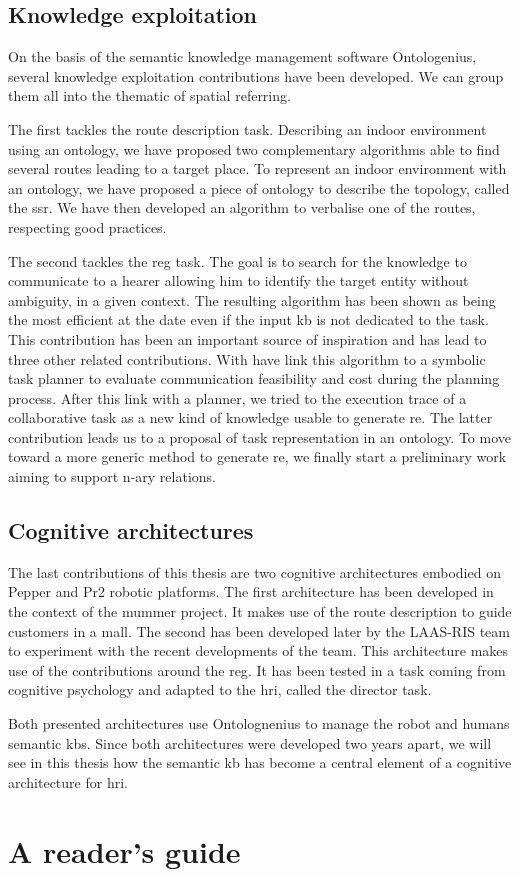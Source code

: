 \subsection{Knowledge exploitation}

On the basis of the semantic knowledge management software Ontologenius, several knowledge exploitation contributions have been developed. We can group them all into the thematic of spatial referring.

The first tackles the route description task. Describing an indoor environment using an ontology, we have proposed two complementary algorithms able to find several routes leading to a target place. To represent an indoor environment with an ontology, we have proposed a piece of ontology to describe the topology, called the \acrlong{ssr}. We have then developed an algorithm to verbalise one of the routes, respecting good practices.

The second tackles the \acrlong{reg} task. The goal is to search for the knowledge to communicate to a hearer allowing him to identify the target entity without ambiguity, in a given context. The resulting algorithm has been shown as being the most efficient at the date even if the input \acrshort{kb} is not dedicated to the task. This contribution has been an important source of inspiration and has lead to three other related contributions. With have link this algorithm to a symbolic task planner to evaluate communication feasibility and cost during the planning process. After this link with a planner, we tried to the execution trace of a collaborative task as a new kind of knowledge usable to generate \acrlong{re}. The latter contribution leads us to a proposal of task representation in an ontology. To move toward a more generic method to generate \acrlong{re}, we finally start a preliminary work aiming to support n-ary relations.

\subsection{Cognitive architectures}

The last contributions of this thesis are two cognitive architectures embodied on Pepper and Pr2 robotic platforms. The first architecture has been developed in the context of the \acrlong{mummer} project. It makes use of the route description to guide customers in a mall. The second has been developed later by the LAAS-RIS team to experiment with the recent developments of the team. This architecture makes use of the contributions around the \acrlong{reg}. It has been tested in a task coming from cognitive psychology and adapted to the \acrlong{hri}, called the director task.

Both presented architectures use Ontolognenius to manage the robot and humans semantic \acrshort{kb}s. Since both architectures were developed two years apart, we will see in this thesis how the semantic \acrlong{kb} has become a central element of a cognitive architecture for \acrlong{hri}.

\section{A reader's guide}


